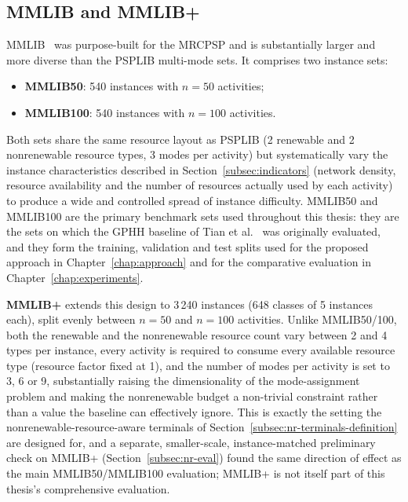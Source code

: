 \subsection{MMLIB and MMLIB+}
\label{subsec:mmlib}

MMLIB~\cite{vanpeteghem2014} was purpose-built for the MRCPSP and is
substantially larger and more diverse than the PSPLIB multi-mode sets. It
comprises two instance sets:

\begin{itemize}
  \item \textbf{MMLIB50}: 540 instances with $n=50$ activities;
  \item \textbf{MMLIB100}: 540 instances with $n=100$ activities.
\end{itemize}

Both sets share the same resource layout as PSPLIB (2 renewable and 2
nonrenewable resource types, 3 modes per activity) but systematically vary
the instance characteristics described in
Section~\ref{subsec:indicators} (network density, resource availability and
the number of resources actually used by each activity) to produce a wide
and controlled spread of instance difficulty. MMLIB50 and MMLIB100 are the
primary benchmark sets used throughout this thesis: they are the sets on
which the GPHH baseline of Tian et al.~\cite{Tian2024GPHH} was originally
evaluated, and they form the training, validation and test splits used for
the proposed approach in Chapter~\ref{chap:approach} and for the comparative
evaluation in Chapter~\ref{chap:experiments}.

\textbf{MMLIB+} extends this design to 3\,240 instances (648 classes of 5
instances each), split evenly between $n=50$ and $n=100$ activities. Unlike
MMLIB50/100, both the renewable and the nonrenewable resource count vary
between 2 and 4 types per instance, every activity is required to consume
every available resource type (resource factor fixed at 1), and the number
of modes per activity is set to 3, 6 or 9, substantially raising the
dimensionality of the mode-assignment problem and making the nonrenewable
budget a non-trivial constraint rather than a value the baseline can
effectively ignore. This is exactly the setting the
nonrenewable-resource-aware terminals of
Section~\ref{subsec:nr-terminals-definition} are designed for, and a
separate, smaller-scale, instance-matched preliminary check on MMLIB+
(Section~\ref{subsec:nr-eval}) found the same direction of effect as the
main MMLIB50/MMLIB100 evaluation; MMLIB+ is not itself part of this
thesis's comprehensive evaluation.

